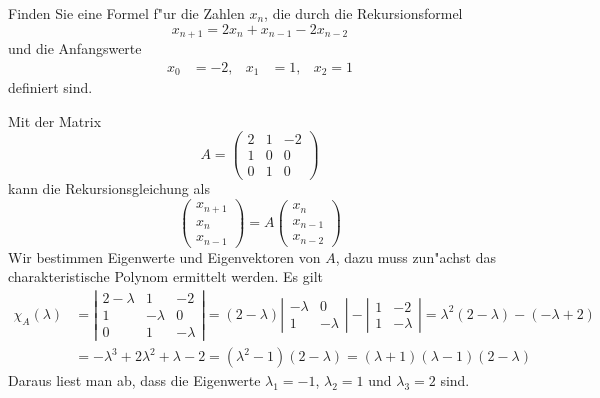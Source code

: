 Finden Sie eine Formel f"ur die Zahlen $x_n$, die durch die Rekursionsformel
\[
x_{n+1}=2x_n+x_{n-1}-2x_{n-2}
\]
und die Anfangswerte
\[
\begin{aligned}
x_0&=-2,& x_1&=1,& x_2=1
\end{aligned}
\]
definiert sind.

\begin{loesung}
Mit der Matrix 
\[
A=\begin{pmatrix}
2&1&-2\\
1&0& 0\\
0&1& 0
\end{pmatrix}
\]
kann die Rekursionsgleichung als
\[
\begin{pmatrix}
x_{n+1}\\
x_{n}\\
x_{n-1}
\end{pmatrix}
=
A
\begin{pmatrix}
x_{n}\\
x_{n-1}\\
x_{n-2}
\end{pmatrix}
\]
Wir bestimmen Eigenwerte und Eigenvektoren von $A$, dazu muss zun"achst
das charakteristische Polynom ermittelt werden.
Es gilt
\begin{align*}
\chi_A(\lambda)
&=
\left|\begin{matrix}
2-\lambda&1&-2\\
1&-\lambda&0\\
0&1&-\lambda
\end{matrix}\right|
=
(2-\lambda)\left|\begin{matrix}-\lambda&0\\1&-\lambda\end{matrix}\right|
-\left|\begin{matrix}1&-2\\1&-\lambda\end{matrix}\right|
=
\lambda^2(2-\lambda)-(-\lambda+2)
\\
&=
-\lambda^3+2\lambda^2+\lambda-2
=
(\lambda^2-1)(2-\lambda)
=
(\lambda+1)(\lambda -1)(2-\lambda)
\end{align*}
Daraus liest man ab, dass die Eigenwerte $\lambda_1=-1$, $\lambda_2=1$ und
$\lambda_3=2$ sind.


\end{loesung}

